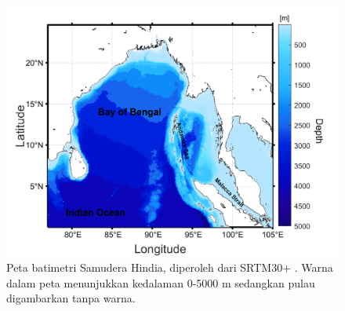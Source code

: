 \begin{spacing}{1.5}
	\begin{figure}[H]
		\centering
		\includegraphics[width=12cm]{contents/Figures/Batimetri_edit_compress}
		\caption{Peta batimetri Samudera Hindia, diperoleh dari SRTM30+ \protect\cite{becker2009global}. Warna dalam peta menunjukkan kedalaman 0-5000 m sedangkan pulau digambarkan tanpa warna.}
		\label{fig:domain}
	\end{figure}
\end{spacing}
\vspace{-0.5pc}
